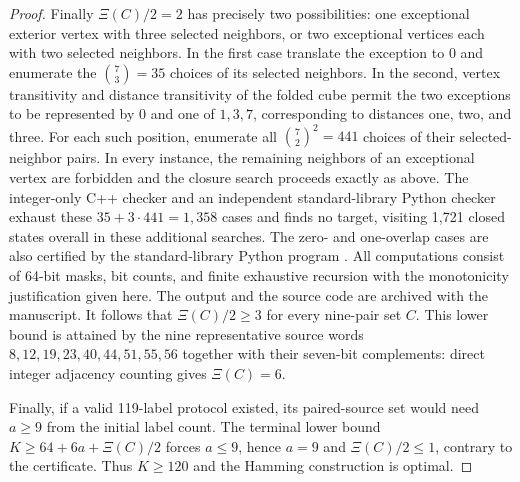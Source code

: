 \documentclass[11pt,a4paper]{article}
\begin{document}
\begin{proof}
Finally $\Xi(C)/2=2$ has precisely two possibilities: one exceptional exterior vertex with three selected neighbors, or two exceptional vertices each with two selected neighbors. In the first case translate the exception to $0$ and enumerate the $\binom73=35$ choices of its selected neighbors. In the second, vertex transitivity and distance transitivity of the folded cube permit the two exceptions to be represented by $0$ and one of $1,3,7$, corresponding to distances one, two, and three. For each such position, enumerate all $\binom72^2=441$ choices of their selected-neighbor pairs. In every instance, the remaining neighbors of an exceptional vertex are forbidden and the closure search proceeds exactly as above. The integer-only C++ checker  and an independent standard-library Python checker  exhaust these $35+3\cdot441=1,358$ cases and finds no target, visiting 1,721 closed states overall in these additional searches. The zero- and one-overlap cases are also certified by the standard-library Python program . All computations consist of 64-bit masks, bit counts, and finite exhaustive recursion with the monotonicity justification given here. The output and the source code are archived with the manuscript. It follows that $\Xi(C)/2\ge3$ for every nine-pair set $C$. This lower bound is attained by the nine representative source words $8,12,19,23,40,44,51,55,56$ together with their seven-bit complements: direct integer adjacency counting gives $\Xi(C)=6$.


Finally, if a valid 119-label protocol existed, its paired-source set would need $a\ge9$ from the initial label count. The terminal lower bound $K\ge64+6a+\Xi(C)/2$ forces $a\le9$, hence $a=9$ and $\Xi(C)/2\le1$, contrary to the certificate. Thus $K\ge120$ and the Hamming construction is optimal.
\end{proof}
\end{document}
